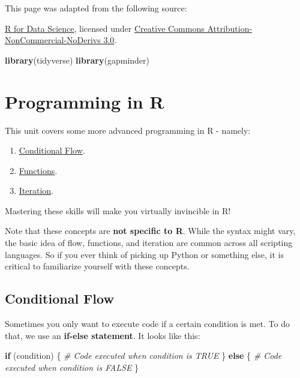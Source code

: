 \documentclass[
]{book}
\newenvironment{Shaded}{\begin{snugshade}}{\end{snugshade}}
\newcommand{\CommentTok}[1]{\textcolor[rgb]{0.56,0.35,0.01}{\textit{#1}}}
\newcommand{\ControlFlowTok}[1]{\textcolor[rgb]{0.13,0.29,0.53}{\textbf{#1}}}
\newcommand{\KeywordTok}[1]{\textcolor[rgb]{0.13,0.29,0.53}{\textbf{#1}}}
\newcommand{\NormalTok}[1]{#1}
\providecommand{\tightlist}{%
  \setlength{\itemsep}{0pt}\setlength{\parskip}{0pt}}
\begin{document}
This page was adapted from the following source:

\href{https://r4ds.had.co.nz}{R for Data Science}, licensed under \href{https://creativecommons.org/licenses/by-nc-nd/3.0/us/}{Creative Commons Attribution-NonCommercial-NoDerivs 3.0}.

\begin{Shaded}
\begin{Highlighting}[]
\KeywordTok{library}\NormalTok{(tidyverse)}
\KeywordTok{library}\NormalTok{(gapminder)}
\end{Highlighting}
\end{Shaded}

\hypertarget{programming-in-r}{%
\chapter{Programming in R}\label{programming-in-r}}

This unit covers some more advanced programming in R - namely:

\begin{enumerate}
\def\labelenumi{\arabic{enumi}.}
\tightlist
\item
  \protect\hyperlink{conditional-flow}{Conditional Flow}.
\item
  \protect\hyperlink{functions-1}{Functions}.
\item
  \protect\hyperlink{iteration}{Iteration}.
\end{enumerate}

Mastering these skills will make you virtually invincible in R!

Note that these concepts are \textbf{not specific to R}. While the syntax might vary, the basic idea of flow, functions, and iteration are common across all scripting languages. So if you ever think of picking up Python or something else, it is critical to familiarize yourself with these concepts.

\hypertarget{conditional-flow}{%
\section{Conditional Flow}\label{conditional-flow}}

Sometimes you only want to execute code if a certain condition is met. To do that, we use an \textbf{if-else statement}. It looks like this:

\begin{Shaded}
\begin{Highlighting}[]
\ControlFlowTok{if}\NormalTok{ (condition) \{}
  \CommentTok{# Code executed when condition is TRUE}
\NormalTok{\} }\ControlFlowTok{else}\NormalTok{ \{}
  \CommentTok{# Code executed when condition is FALSE}
\NormalTok{\}}
\end{Highlighting}
\end{Shaded}
\end{document}
